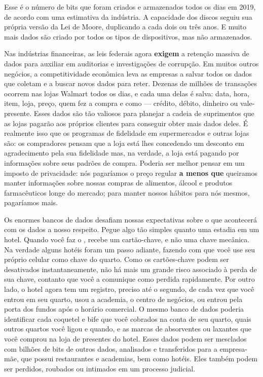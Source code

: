 Esse é o número de bits que foram criados e armazenados todos os dias em 2019,
de acordo com uma estimativa da indústria. A capacidade dos discos seguiu sua
própria versão da Lei de Moore, duplicando a cada dois ou três anos. E muito
mais dados são criado por todos os tipos de dispositivos, mas não armazenados.

Nas indústrias financeiras, as leis federais agora \textbf{exigem} a retenção
massiva de dados para auxiliar em auditorias e investigações de corrupção. Em
muitos outros negócios, a competitividade econômica leva as empresas a salvar
todos os dados que coletam e a buscar novos dados para reter. Dezenas de milhões
de transações ocorrem nas lojas Walmart todos os dias, e cada uma delas é salva:
data, hora, item, loja, preço, quem fez a compra e como --- crédito, débito,
dinheiro ou vale-presente. Esses dados são tão valiosos para planejar a cadeia
de suprimentos que as lojas pagarão aos próprios clientes para conseguir obter
mais dados deles. É realmente isso que os programas de fidelidade em
supermercados e outras lojas são: os compradores pensam que a loja está lhes
concedendo um desconto em agradecimento pela sua fidelidade mas, na verdade, a
loja está pagando por informações sobre seus padrões de compra. Poderia ser
melhor pensar em um imposto de privacidade: nós pagaríamos o preço regular
\textbf{a menos que} queiramos manter informações sobre nossas compras de
alimentos, álcool e produtos farmacêuticos longe do mercado; para manter nossos
hábitos para nós mesmos, pagaríamos mais.

Os enormes bancos de dados desafiam nossas expectativas sobre o que acontecerá
com os dados a nosso respeito. Pegue algo tão simples quanto uma estadia em um
hotel. Quando você faz o , recebe um cartão-chave, e não uma
chave mecânica. Na verdade alguns
hotéis foram um passo adiante, fazendo com que 
você use seu próprio celular como chave do quarto. Como os cartões-chave podem
ser desativados instantaneamente, não há mais um grande risco associado à perda
de sua chave, contanto que você a comunique como perdida rapidamente. Por outro
lado, o hotel agora tem um registro, preciso até o segundo, de cada vez que você
entrou em seu quarto, usou a academia, o centro de negócios, ou entrou pela
porta dos fundos após o horário comercial. O mesmo banco de dados poderia
identificar cada coquetel e bife que você cobrados na conta de seu quarto, quais
outros quartos você ligou e quando, e as marcas de absorventes ou laxantes que
você comprou na loja de presentes do hotel. Esses dados podem ser mesclados com
bilhões de bits de outros dados, analisados e transferidos para a empresa-mãe,
que possui restaurantes e academias, bem como hotéis. Eles também podem ser
perdidos, roubados ou intimados em um processo judicial.

